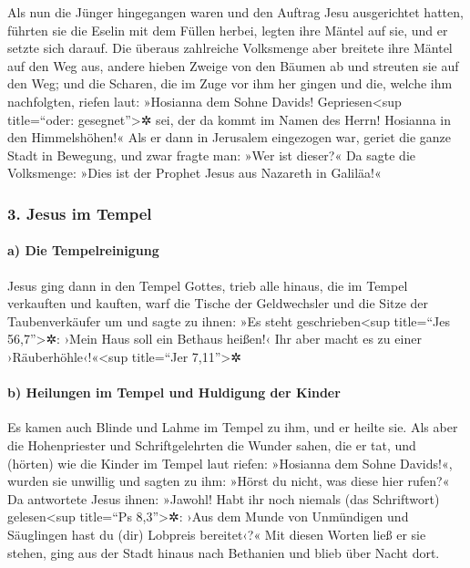 Als nun die Jünger hingegangen waren und den Auftrag Jesu
ausgerichtet hatten,  führten sie die Eselin mit dem
Füllen herbei, legten ihre Mäntel auf sie, und er setzte sich darauf.
 Die überaus zahlreiche Volksmenge aber breitete ihre
Mäntel auf den Weg aus, andere hieben Zweige von den Bäumen ab und
streuten sie auf den Weg;  und die Scharen, die im Zuge
vor ihm her gingen und die, welche ihm nachfolgten, riefen laut:
»Hosianna dem Sohne Davids! Gepriesen\textless sup title=``oder:
gesegnet''\textgreater✲ sei, der da kommt im Namen des Herrn! Hosianna
in den Himmelshöhen!«  Als er dann in Jerusalem
eingezogen war, geriet die ganze Stadt in Bewegung, und zwar fragte man:
»Wer ist dieser?«  Da sagte die Volksmenge: »Dies ist der
Prophet Jesus aus Nazareth in Galiläa!«

\hypertarget{jesus-im-tempel}{%
\subsubsection{3. Jesus im Tempel}\label{jesus-im-tempel}}

\hypertarget{a-die-tempelreinigung}{%
\paragraph{a) Die Tempelreinigung}\label{a-die-tempelreinigung}}

 Jesus ging dann in den Tempel Gottes, trieb alle hinaus,
die im Tempel verkauften und kauften, warf die Tische der Geldwechsler
und die Sitze der Taubenverkäufer um  und sagte zu ihnen:
»Es steht geschrieben\textless sup title=``Jes 56,7''\textgreater✲:
›Mein Haus soll ein Bethaus heißen!‹ Ihr aber macht es zu einer
›Räuberhöhle‹!«\textless sup title=``Jer 7,11''\textgreater✲

\hypertarget{b-heilungen-im-tempel-und-huldigung-der-kinder}{%
\paragraph{b) Heilungen im Tempel und Huldigung der
Kinder}\label{b-heilungen-im-tempel-und-huldigung-der-kinder}}

 Es kamen auch Blinde und Lahme im Tempel zu ihm, und er
heilte sie.  Als aber die Hohenpriester und
Schriftgelehrten die Wunder sahen, die er tat, und (hörten) wie die
Kinder im Tempel laut riefen: »Hosianna dem Sohne Davids!«, wurden sie
unwillig  und sagten zu ihm: »Hörst du nicht, was diese
hier rufen?« Da antwortete Jesus ihnen: »Jawohl! Habt ihr noch niemals
(das Schriftwort) gelesen\textless sup title=``Ps 8,3''\textgreater✲:
›Aus dem Munde von Unmündigen und Säuglingen hast du (dir) Lobpreis
bereitet‹?«  Mit diesen Worten ließ er sie stehen, ging
aus der Stadt hinaus nach Bethanien und blieb über Nacht dort.

